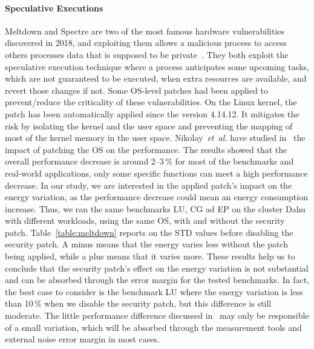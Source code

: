 \paragraph{Speculative Executions}
Meltdown and Spectre are two of the most famous hardware vulnerabilities discovered in 2018, and exploiting them allows a malicious process to access others processes data that is supposed to be private~\cite{Kocher2018spectre,Lipp2018meltdown}.
They both exploit the speculative execution technique where a process anticipates some upcoming tasks, which are not guaranteed to be executed, when extra resources are available, and revert those changes if not.
Some OS-level patches had been applied to prevent/reduce the criticality of these vulnerabilities.
On the Linux kernel, the patch has been automatically applied since the version 4.14.12.
It mitigates the risk by isolating the kernel and the user space and preventing the mapping of most of the kernel memory in the user space.
Nikolay~\emph{et~al.} have studied in~\cite{DBLP:journals/corr/abs-1801-04329} the impact of patching the OS on the performance.
The results showed that the overall performance decrease is around 2--3\,\% for most of the benchmarks and real-world applications, only some specific functions can meet a high performance decrease.
In our study, we are interested in the applied patch's impact on the energy variation, as the performance decrease could mean an energy consumption increase.
Thus, we ran the same benchmarks \textsf{LU}, \textsf{CG} ad \textsf{EP} on the cluster \textsf{Dahu} with different workloads, using the same OS, with and without the security patch.
Table~\ref{table:meltdown} reports on the STD values before disabling the security patch.
A minus means that the energy varies less without the patch being applied, while a plus means that it varies more.
These results help us to conclude that the security patch's effect on the energy variation is not substantial and can be absorbed through the error margin for the tested benchmarks.
In fact, the best case to consider is the benchmark \textsf{LU} where the energy variation is less than 10\,\% when we disable the security patch, but this difference is still moderate.
The little performance difference discussed in~\cite{Kocher2018spectre,Lipp2018meltdown} may only be responsible of a small variation, which will be absorbed through the measurement tools and external noise error margin in most cases.

